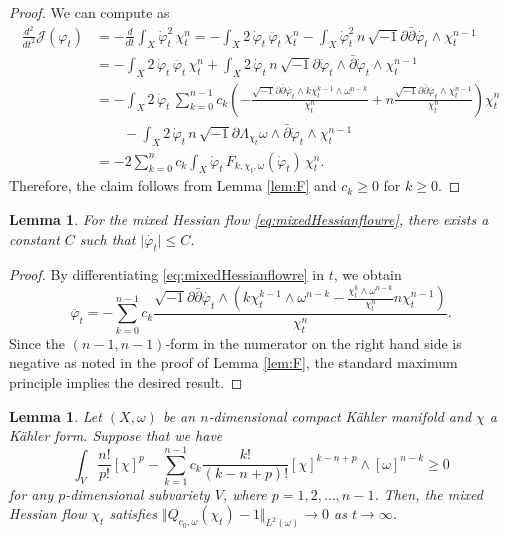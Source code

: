 \documentclass{amsart}
\numberwithin{equation}{section}
\theoremstyle{plain}
\newtheorem{lem}[equation]{Lemma}
\theoremstyle{definition}
\theoremstyle{remark}
\newcommand{\delb}{\sqrt{-1}\partial\bar{\partial}}
\begin{document}
\begin{proof}
    We can compute as
    \begin{align*}
        \frac{d^2}{dt^2}\mathcal{J}(\varphi_t)
        &= - \frac{d}{dt} \int_X \dot{\varphi}_t^2 \, \chi_t^n
        = - \int_X 2 \, \dot{\varphi}_t \, \ddot{\varphi_t} \, \chi^n_t 
          - \int_X \dot{\varphi}_t^2 \, n \, \delb \dot{\varphi_t}  \wedge \chi^{n-1}_t \\
        &= - \int_X 2 \, \dot{\varphi}_t \, \ddot{\varphi_t} \, \chi^n_t 
           + \int_X 2 \, \dot{\varphi}_t \, n \, \sqrt{-1} \partial \dot{\varphi}_t\wedge \bar{\partial} \dot{\varphi}_t \wedge \chi^{n-1}_t \\
        &= - \int_X 2\, \dot{\varphi}_t \, \sum_{k=0}^{n-1}c_k\left(-\frac{\delb \dot{\varphi_t}\wedge k\chi_t^{k-1}\wedge\omega^{n-k}}{\chi^n_t}+n\frac{\delb\dot{\varphi_t}\wedge\chi_t^{n-1}}{\chi_t^n}\right)\chi^n_t\\
        &\qquad- \int_X 2 \, \dot{\varphi}_t \, n \, \sqrt{-1} \partial \Lambda_{\chi_t} \omega \wedge \bar{\partial} \dot{\varphi}_t \wedge \chi^{n-1}_t \\
        &= -2 \sum_{k=0}^n c_k\int_X \dot{\varphi}_t \, F_{k,\chi_t,\omega}(\dot{\varphi}_t) \, \chi^n_t.
    \end{align*}
    Therefore, the claim follows from Lemma \ref{lem:F} and $c_k\ge0$ for $k\ge0$.
\end{proof}

\begin{lem}\label{lem:bound}
    For the mixed Hessian flow \eqref{eq:mixedHessianflowre}, there exists a constant $C$ such that
    $\vert\dot{\varphi_t}\vert\le C$.
\end{lem}

\begin{proof}
    By differentiating \eqref{eq:mixedHessianflowre} in $t$, we obtain
    $$\ddot{\varphi_t}=-\sum_{k=0}^{n-1}c_k\frac{\delb\dot{\varphi_t}\wedge \left(k\chi_t^{k-1}\wedge\omega^{n-k}-\frac{\chi_t^k\wedge\omega^{n-k}}{\chi_t^n}n\chi_t^{n-1}\right)}{\chi_t^n}.$$
    Since the $(n-1,n-1)$-form in the numerator on the right hand side is negative as noted in the proof of Lemma \ref{lem:F}, the standard maximum principle implies the desired result.
\end{proof}

\begin{lem}\label{lem:conv}
    Let $(X,\omega)$ be an $n$-dimensional compact Kähler manifold and $\chi$ a Kähler form. Suppose that we have
    $$\int_V\frac{n!}{p!}[\chi]^p-\sum_{k=1}^{n-1}c_k\frac{k!}{(k-n+p)!}[\chi]^{k-n+p}\wedge[\omega]^{n-k}\ge0$$
    for any $p$-dimensional subvariety $V$, where $p=1,2,\dots,{n-1}$. Then, the mixed Hessian flow $\chi_t$ satisfies $\Vert Q_{c_0,\omega}(\chi_t)-1 \Vert_{L^2(\omega)}\to0$ as $t\to\infty$.
\end{lem}
\end{document}
